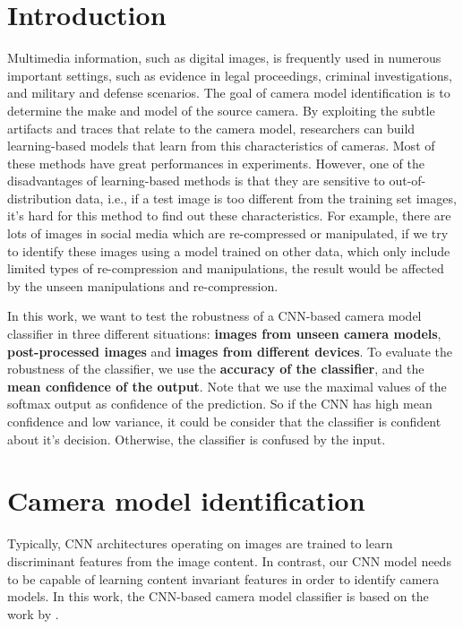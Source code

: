\documentclass[a4paper, 9pt, twocolumn]{extarticle}
\begin{document}
\section{Introduction}
\label{section:introduction}

Multimedia information, such as digital images, is frequently used in numerous important settings, such as evidence in legal proceedings, criminal investigations, and military and defense scenarios. The goal of camera model identification is to determine the make and model of the source camera. By exploiting the subtle artifacts and traces that relate to the camera model, researchers can build learning-based models that learn from this characteristics of cameras. Most of these methods have great performances in experiments. However, one of the disadvantages of learning-based methods is that they are sensitive to out-of-distribution data, i.e., if a test image is too different from the training set images, it's hard for this method to find out these characteristics. For example, there are lots of images in social media which are re-compressed or manipulated, if we try to identify these images using a model trained on other data, which only include limited types of re-compression and manipulations, the result would be affected by the unseen manipulations and re-compression.

In this work, we want to test the robustness of a CNN-based camera model classifier in three different situations: \textbf{images from unseen camera models}, \textbf{post-processed images} and \textbf{images from different devices}. To evaluate the robustness of the classifier, we use the \textbf{accuracy of the classifier}, and the \textbf{mean confidence of the output}. Note that we use the maximal values of the softmax output as confidence of the prediction. So if the CNN has high mean confidence and low variance, it could be consider that the classifier is confident about it's decision. Otherwise, the classifier is confused by the input.

\section{Camera model identification}
\label{section:camera model identification}

Typically, CNN architectures operating on images are trained to learn discriminant features from the image content. In contrast, our CNN model needs to be capable of learning content invariant features in order to identify camera models. In this work, the CNN-based camera model classifier is based on the work by \citeauthor{bayar2017design} \cite{bayar2017design}. 
\end{document}
